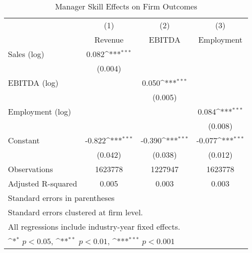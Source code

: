 \begin{table}[htbp]\centering
\def\sym#1{\ifmmode^{#1}\else\(^{#1}\)\fi}
\caption{Manager Skill Effects on Firm Outcomes}
\begin{tabular}{l*{3}{c}}
\toprule
                    &\multicolumn{1}{c}{(1)}&\multicolumn{1}{c}{(2)}&\multicolumn{1}{c}{(3)}\\
                    &\multicolumn{1}{c}{Revenue}&\multicolumn{1}{c}{EBITDA}&\multicolumn{1}{c}{Employment}\\
\midrule
Sales (log)         &       0.082\sym{***}&                     &                     \\
                    &     (0.004)         &                     &                     \\
\addlinespace
EBITDA (log)        &                     &       0.050\sym{***}&                     \\
                    &                     &     (0.005)         &                     \\
\addlinespace
Employment (log)    &                     &                     &       0.084\sym{***}\\
                    &                     &                     &     (0.008)         \\
\addlinespace
Constant            &      -0.822\sym{***}&      -0.390\sym{***}&      -0.077\sym{***}\\
                    &     (0.042)         &     (0.038)         &     (0.012)         \\
\midrule
Observations        &     1623778         &     1227947         &     1623778         \\
Adjusted R-squared  &       0.005         &       0.003         &       0.003         \\
\bottomrule
\multicolumn{4}{l}{\footnotesize Standard errors in parentheses}\\
\multicolumn{4}{l}{\footnotesize Standard errors clustered at firm level.}\\
\multicolumn{4}{l}{\footnotesize All regressions include industry-year fixed effects.}\\
\multicolumn{4}{l}{\footnotesize \sym{*} \(p<0.05\), \sym{**} \(p<0.01\), \sym{***} \(p<0.001\)}\\
\end{tabular}
\end{table}
